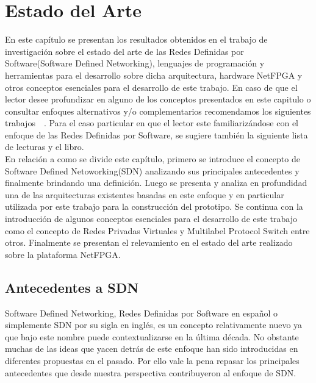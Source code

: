 
\chapter{Estado del Arte}  %

\ifpdf
    \graphicspath{{Chapter2/Figs/Raster/}{Chapter2/Figs/PDF/}{Chapter2/Figs/}}
\else
    \graphicspath{{Chapter2/Figs/Vector/}{Chapter2/Figs/}}
\fi

En este capítulo se presentan los resultados obtenidos en el trabajo de investigación sobre el estado
del arte de las Redes Definidas por Software(Software Defined Networking), lenguajes
de programación y herramientas para el desarrollo sobre dicha arquitectura, hardware NetFPGA y otros conceptos esenciales para el desarrollo de este trabajo. En caso de que el lector desee profundizar en alguno de los conceptos presentados en este capitulo o consultar enfoques alternativos
y/o complementarios recomendamos los siguientes trabajos~\citep{StateOfArt1}~\citep{StateOfArt2}. Para el caso particular en que el lector este familiarizándose con el enfoque de las Redes Definidas por Software, se sugiere también la siguiente lista de lecturas\citep{SDNReadingList} y el libro\citep{SDNBook1}.\\

En relación a como se divide este cap\'itulo, primero se introduce el concepto de Software Defined Netoworking(SDN) analizando sus principales antecedentes y finalmente brindando una definición. Luego se presenta y analiza en profundidad una de las arquitecturas existentes basadas en este enfoque y en particular utilizada por este trabajo para la construcción del prototipo. Se continua con la introducción de algunos conceptos esenciales para el desarrollo de este trabajo como el concepto de Redes Privadas Virtuales y Multilabel Protocol Switch entre otros. Finalmente se presentan el relevamiento en el estado del arte realizado sobre la plataforma NetFPGA.  

\section{Antecedentes a SDN} %
Software Defined Networking, Redes Definidas por Software en español o simplemente SDN por su sigla en ingl\'es, es un concepto relativamente nuevo ya que bajo este nombre puede contextualizarse en la \'ultima década. No obstante muchas de las ideas que yacen detrás de este enfoque han sido introducidas en diferentes propuestas en el pasado. Por ello vale la pena repasar los principales antecedentes que desde nuestra perspectiva contribuyeron al enfoque de SDN. 

